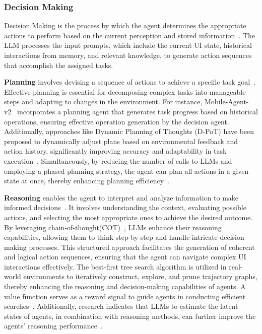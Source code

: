 \subsubsection{Decision Making}

Decision Making is the process by which the agent determines the appropriate actions to perform based on the current perception and stored information~\cite{xi2023rise}. The LLM processes the input prompts, which include the current UI state, historical interactions from memory, and relevant knowledge, to generate action sequences that accomplish the assigned tasks.


\noindent\textbf{Planning}
involves devising a sequence of actions to achieve a specific task goal~\cite{song2023llm,xi2023rise}. Effective planning is essential for decomposing complex tasks into manageable steps and adapting to changes in the environment. For instance, Mobile-Agent-v2~\cite{wang2024mobileagentv2} incorporates a planning agent that generates task progress based on historical operations, ensuring effective operation generation by the decision agent. Additionally, approaches like Dynamic Planning of Thoughts (D-PoT) have been proposed to dynamically adjust plans based on environmental feedback and action history, significantly improving accuracy and adaptability in task execution~\cite{zhang2024dynamic}. Simultaneously, by reducing the number of calls to LLMs and employing a phased planning strategy, the agent can plan all actions in a given state at once, thereby enhancing planning efficiency~\cite{li2023zero}.



\noindent\textbf{Reasoning}
enables the agent to interpret and analyze information to make informed decisions~\cite{gandhi2024understanding,chen2024optimizing,plaat2024reasoning}. It involves understanding the context, evaluating possible actions, and selecting the most appropriate ones to achieve the desired outcome. By leveraging chain-of-thought(COT)~\cite{wei2022chain}, LLMs enhance their reasoning capabilities, allowing them to think step-by-step and handle intricate decision-making processes. This structured approach facilitates the generation of coherent and logical action sequences, ensuring that the agent can navigate complex UI interactions effectively.
The best-first tree search algorithm is utilized in real-world environments to iteratively construct, explore, and prune trajectory graphs, thereby enhancing the reasoning and decision-making capabilities of agents. A value function serves as a reward signal to guide agents in conducting efficient searches~\cite{koh2024tree}. Additionally, research indicates that LLMs to estimate the latent states of agents, in combination with reasoning methods, can further improve the agents' reasoning performance~\cite{bishop2024latent}.


